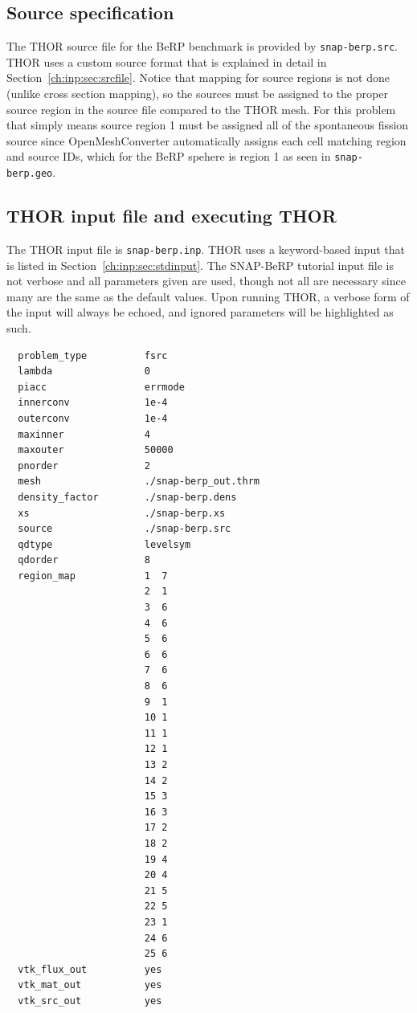 \subsection{Source specification}

The \ac{THOR} source file for the BeRP benchmark is provided by \verb"snap-berp.src".
\ac{THOR} uses a custom source format that is explained in detail in Section~\ref{ch:inp:sec:srcfile}.
Notice that mapping for source regions is not done (unlike cross section mapping), so the sources must be assigned to the proper source region in the source file compared to the THOR mesh.
For this problem that simply means source region 1 must be assigned all of the spontaneous fission source since OpenMeshConverter automatically assigns each cell matching region and source IDs, which for the BeRP spehere is region 1 as seen in \verb"snap-berp.geo".

\subsection{THOR input file and executing THOR}

The \ac{THOR} input file is \verb"snap-berp.inp".
\ac{THOR} uses a keyword-based input that is listed in Section~\ref{ch:inp:sec:stdinput}.
The SNAP-BeRP tutorial input file is not verbose and all parameters given are used, though not all are necessary since many are the same as the default values.
Upon running \ac{THOR}, a verbose form of the input will always be echoed, and ignored parameters will be highlighted as such.
\begin{verbatim}
  problem_type          fsrc
  lambda                0
  piacc                 errmode
  innerconv             1e-4
  outerconv             1e-4
  maxinner              4
  maxouter              50000
  pnorder               2
  mesh                  ./snap-berp_out.thrm
  density_factor        ./snap-berp.dens
  xs                    ./snap-berp.xs
  source                ./snap-berp.src
  qdtype                levelsym
  qdorder               8
  region_map            1  7
                        2  1
                        3  6
                        4  6
                        5  6
                        6  6
                        7  6
                        8  6
                        9  1
                        10 1
                        11 1
                        12 1
                        13 2
                        14 2
                        15 3
                        16 3
                        17 2
                        18 2
                        19 4
                        20 4
                        21 5
                        22 5
                        23 1
                        24 6
                        25 6
  vtk_flux_out          yes
  vtk_mat_out           yes
  vtk_src_out           yes
\end{verbatim}

